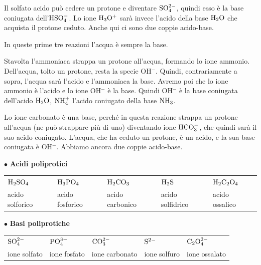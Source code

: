 \vspace{0.2cm}

\vspace{0.2cm}Il solfato acido può cedere un protone e diventare $\rm SO_4^{2-}$, quindi esso è la base coniugata dell'$\rm HSO_4^-$. Lo ione $\rm H_3O^+$ sarà invece l'acido della base $\rm H_2O$ che acquista il protone ceduto. Anche qui ci sono due coppie acido-base.

\vspace{0.2cm}In queste prime tre reazioni l'acqua è sempre la base.

\vspace{0.2cm}

\vspace{0.2cm}Stavolta l'ammoniaca strappa un protone all'acqua, formando lo ione ammonio. Dell'acqua, tolto un protone, resta la specie OH$^-$. Quindi, contrariamente a sopra, l'acqua sarà l'acido e l'ammoniaca la base. Avremo poi che lo ione ammonio è l'acido e lo ione OH$^-$ è la base. Quindi OH$^-$ è la base coniugata dell'acido $\rm H_2O$, $\rm NH_4^+$ l'acido coniugato della base $\rm NH_3$.

\vspace{0.2cm}

\vspace{0.2cm}Lo ione carbonato è una base, perché in questa reazione strappa un protone all'acqua (ne può strappare più di uno) diventando ione $\rm HCO_3^-$, che quindi sarà il suo acido coniugato. L'acqua, che ha ceduto un protone, è un acido, e la sua base coniugata è OH$^-$. Abbiamo ancora due coppie acido-base.

\vspace{0.2cm}$\bullet$ \textbf{Acidi poliprotici}
\begin{center}
\begin{tabular}{lllll}
    $\rm H_2SO_4$ & $\rm H_3PO_4$ & $\rm H_2CO_3$ & $\rm H_2S$ & $\rm H_2C_2O_4$\\
    acido solforico & acido fosforico & acido carbonico & acido solfidrico & acido ossalico    
\end{tabular}
\end{center}
\vspace{0.2cm}$\bullet$ \textbf{Basi poliprotiche}
\begin{center}
\begin{tabular}{lllll}
    $\rm SO_4^{2-}$ & $\rm PO_4^{3-}$ & $\rm CO_3^{2-}$ & $\rm S^{2-}$ & $\rm C_2O_4^{2-}$\\
    ione solfato & ione fosfato & ione carbonato & ione solfuro & ione ossalato    
\end{tabular}
\end{center}

